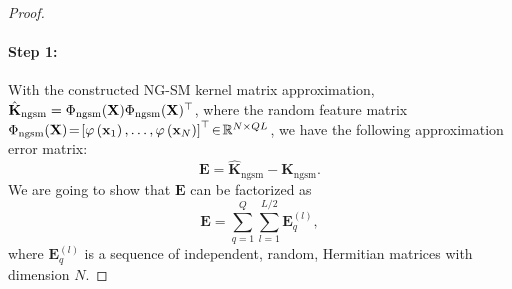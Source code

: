 \begin{proof}
\paragraph{Step 1:}With the constructed NG-SM kernel matrix approximation, $\hat{\mathbf{K}}_{\mathrm{ngsm}} =  \Phi_{\mathrm{ngsm}}({\mathbf X}) \Phi_{\mathrm{ngsm}}({\mathbf X})^\top$, where the random feature matrix $\Phi_{\mathrm{ngsm}}({\mathbf X})\!=\!\left[\varphi\left({\mathbf x}_1\right),  \ldots , \varphi\left({\mathbf x}_N\right)\right]^\top \!\in \! \mathbb{R}^{N \times QL}$, we have the following approximation error matrix:
\begin{equation}
   \mathbf{E} = \hat{\mathbf{K}}_{\mathrm{ngsm}} - {\mathbf{K}}_{\mathrm{ngsm}}.
\end{equation}
We are going to show that $\mathbf{E}$ can be factorized as 
\begin{equation}
    \mathbf{E} = \sum_{q=1}^Q \sum_{l=1}^{L/2} \mathbf{E}_{q}^{(l)},
\end{equation}
where $\mathbf{E}_{q}^{(l)}$ is a sequence of independent, random, Hermitian matrices with dimension $N$.


\end{proof}
